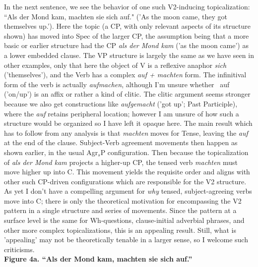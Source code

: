 \documentclass[12pt]{article}
\begin{document}
\begin{flushleft}
In the next sentence, we see the behavior of one such V2-inducing topicalization: ``Als der Mond kam, machten sie sich auf." ('As the moon came, they got themselves up.'). Here the topic (a CP, with only relevant aspects of its structure shown) has moved into Spec of the larger CP, the assumption being that a more basic or earlier structure had the CP {\it als der Mond kam} ('as the moon came') as a lower embedded clause. The VP structure is largely the same as we have seen in other examples, only that here the object of V is a reflexive anaphor {\it sich} ('themselves'), and the Verb has a complex {\it auf + machten} form. The infinitival form of the verb is actually {\it aufmachen}, although I'm unsure whether {\ auf} ('on/up') is an affix or rather a kind of clitic. The clitic argument seems stronger because we also get constructions like {\it aufgemacht} ('got up'; Past Participle), where the {\it auf} retains peripheral location; however I am unsure of how such a structure would be organized so I have left it opaque here. The main result which has to follow from any analysis is that {\it machten} moves for Tense, leaving the {\it auf} at the end of the clause. Subject-Verb agreement movements then happen as shown earlier, in the usual Agr$_s$P configuration. Then because the topicalization of {\it als der Mond kam} projects a higher-up CP, the tensed verb {\it machten} must move higher up into C. This movement yields the requisite order and aligns with other such CP-driven configurations which are responsible for the V2 structure. As yet I don't have a compelling argument for {\it why} tensed, subject-agreeing verbs move into C; there is only the theoretical motivation for encompassing the V2 pattern in a single structure and series of movements. Since the pattern at a surface level is the same for Wh-questions, clause-initial adverbial phrases, and other more complex topicalizations, this is an appealing result. Still, what is 'appealing' may not be theoretically tenable in a larger sense, so I welcome such criticisms. \\
\newpage
{\bf Figure 4a. ``Als der Mond kam, machten sie sich auf.''}\\
\bigskip
{\centering
{}\\
}
\end{flushleft}
\end{document}
